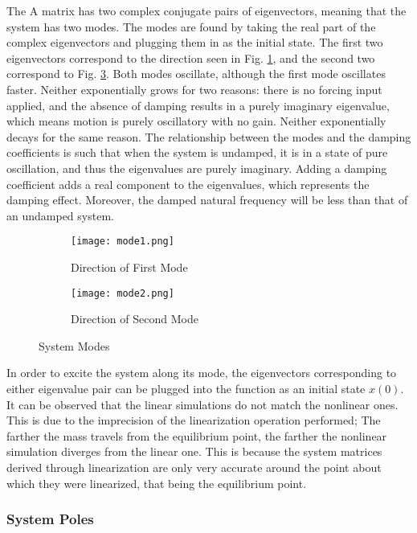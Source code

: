\documentclass[../notes.tex]{subfiles}
\begin{document}
The A matrix has two complex conjugate pairs of eigenvectors, meaning that the system has two modes. The modes are found by taking the real part of the complex eigenvectors and plugging them in as the initial state. The first two eigenvectors correspond to the direction seen in Fig. \ref{fig:mode1}, and the second two correspond to Fig. \ref{fig:mode2}. Both modes oscillate, although the first mode oscillates faster. Neither exponentially grows for two reasons: there is no forcing input applied, and the absence of damping results in a purely imaginary eigenvalue, which means motion is purely oscillatory with no gain. Neither exponentially decays for the same reason. The relationship between the modes and the damping coefficients is such that when the system is undamped, it is in a state of pure oscillation, and thus the eigenvalues are purely imaginary. Adding a damping coefficient adds a real component to the eigenvalues, which represents the damping effect. Moreover, the damped natural frequency will be less than that of an undamped system.

\begin{figure}[H]
    \centering
    \begin{subfigure}{.5\textwidth}
        \centering
        \texttt{[image: mode1.png]}
        \caption{Direction of First Mode}
        \label{fig:mode1}
    \end{subfigure}%
    \begin{subfigure}{.5\textwidth}
        \centering
        \texttt{[image: mode2.png]}
        \caption{Direction of Second Mode}
        \label{fig:mode2}
    \end{subfigure}
    
    \caption{System Modes}
\end{figure}

In order to excite the system along its mode, the eigenvectors corresponding to either eigenvalue pair can be plugged into the function as an initial state $x(0)$. It can be observed that the linear simulations do not match the nonlinear ones. This is due to the imprecision of the linearization operation performed; The farther the mass travels from the equilibrium point, the farther the nonlinear simulation diverges from the linear one. This is because the system matrices derived through linearization are only very accurate around the point about which they were linearized, that being the equilibrium point.

\subsubsection{System Poles}
\end{document}
